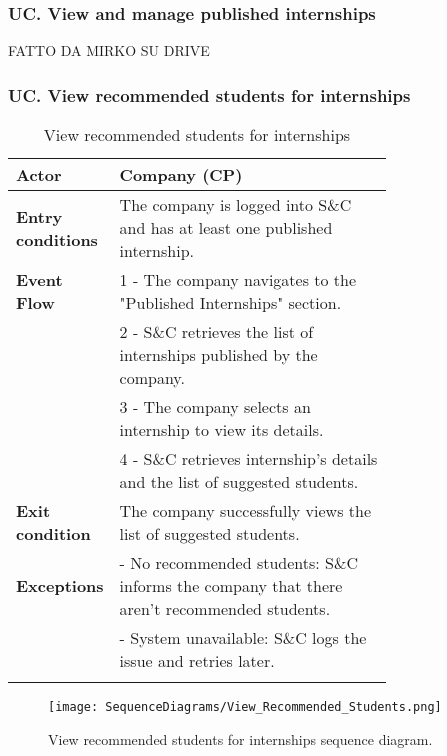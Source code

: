 \subsubsection*{UC\cuc . View and manage published internships}
FATTO DA MIRKO SU DRIVE

\subsubsection*{UC\cuc . View recommended students for internships}
\begin{center}
    \begin{longtable}{|l|p{0.75\linewidth}|}
        \hline
        \textbf{Actor}            & Company (CP)\\
        \hline
        \textbf{Entry conditions} & The company is logged into S\&C and has at least one published internship.\\
        \hline
        \textbf{Event Flow}     & 1 - The company navigates to the "Published                              Internships" section. \\
                                & 2 - S\&C retrieves the list of internships published by the company. \\
                                & 3 - The company selects an internship to view its details. \\
                                & 4 - S\&C retrieves internship's details and the list of suggested students.\\
        \hline
        \textbf{Exit condition}     & The company successfully views the list of                                suggested students.\\       
        \hline
        \textbf{Exceptions}     & - No recommended students: S\&C informs the company that there aren't recommended students. \\
                                & - System unavailable: S\&C logs the issue and retries later. \\
        \hline
        \caption{View recommended students for internships}
        \label{tab: view_recommended_students_for_internships_usecase}
    \end{longtable}
\end{center}

\begin{figure}[H]
    \begin{center}
        \texttt{[image: SequenceDiagrams/View\_Recommended\_Students.png]}
        \caption{View recommended students for internships sequence diagram.}
        \label{fig:view_recommended_students_seqd}%
    \end{center}
\end{figure}

